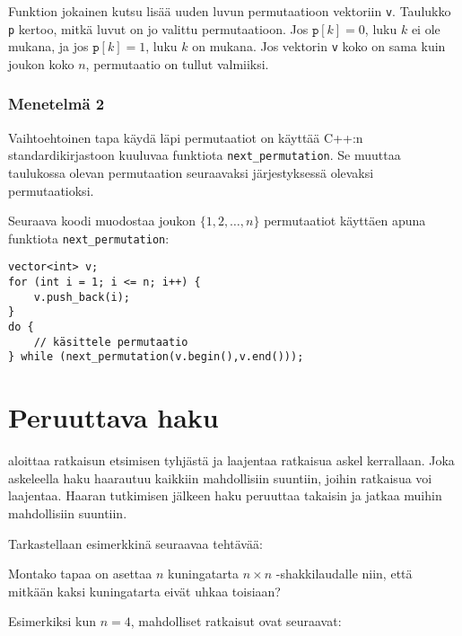 Funktion jokainen kutsu lisää uuden
luvun permutaatioon vektoriin \texttt{v}.
Taulukko \texttt{p} kertoo, mitkä luvut on jo
valittu permutaatioon.
Jos $\texttt{p}[k]=0$, luku $k$ ei ole mukana,
ja jos $\texttt{p}[k]=1$, luku $k$ on mukana.
Jos vektorin \texttt{v} koko on sama kuin
joukon koko $n$, permutaatio on tullut valmiiksi.

\subsubsection{Menetelmä 2}


Vaihtoehtoinen tapa käydä läpi permutaatiot
on käyttää C++:n standardikirjastoon kuuluvaa
funktiota \texttt{next\_permutation}.
Se muuttaa taulukossa olevan permutaation
seuraavaksi järjestyksessä olevaksi permutaatioksi.

Seuraava koodi muodostaa joukon $\{1,2,\ldots,n\}$
permutaatiot käyttäen apuna funktiota \texttt{next\_permutation}:

\begin{lstlisting}
vector<int> v;
for (int i = 1; i <= n; i++) {
    v.push_back(i);
}
do {
    // käsittele permutaatio
} while (next_permutation(v.begin(),v.end()));
\end{lstlisting}

\section{Peruuttava haku}


aloittaa ratkaisun etsimisen tyhjästä
ja laajentaa ratkaisua askel kerrallaan.
Joka askeleella haku haarautuu kaikkiin
mahdollisiin suuntiin, joihin ratkaisua voi laajentaa.
Haaran tutkimisen jälkeen haku peruuttaa takaisin
ja jatkaa muihin mahdollisiin suuntiin.

Tarkastellaan esimerkkinä seuraavaa tehtävää:

\begin{task}
Montako tapaa on asettaa $n$ kuningatarta
$n \times n$ -shakkilaudalle niin,
että mitkään kaksi kuningatarta eivät uhkaa toisiaan?
\end{task}

Esimerkiksi kun $n=4$, mahdolliset ratkaisut ovat seuraavat:

\begin{center}
\end{center}

